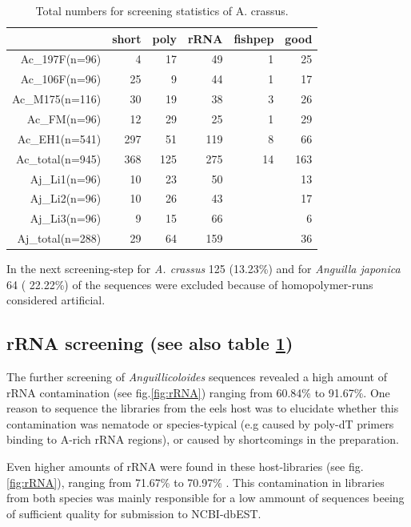\documentclass[12pt,a4paper]{article}
\begin{document}
\begin{table}[ht]
\begin{center}
\begin{tabular}{rrrrrr}
  \hline
 & short & poly & rRNA & fishpep & good \\ 
  \hline
Ac\_197F(n=96) &   4 &  17 &  49 &   1 &  25 \\ 
  Ac\_106F(n=96) &  25 &   9 &  44 &   1 &  17 \\ 
  Ac\_M175(n=116) &  30 &  19 &  38 &   3 &  26 \\ 
  Ac\_FM(n=96) &  12 &  29 &  25 &   1 &  29 \\ 
  Ac\_EH1(n=541) & 297 &  51 & 119 &   8 &  66 \\ 
  Ac\_total(n=945) & 368 & 125 & 275 &  14 & 163 \\ 
  Aj\_Li1(n=96) &  10 &  23 &  50 &  &  13 \\ 
  Aj\_Li2(n=96) &  10 &  26 &  43 &  &  17 \\ 
  Aj\_Li3(n=96) &   9 &  15 &  66 &  &   6 \\ 
  Aj\_total(n=288) &  29 &  64 & 159 &  &  36 \\ 
   \hline
\end{tabular}
\caption{Total numbers for screening statistics of A. crassus.}
\label{tab:num}
\end{center}
\end{table}
In the next screening-step for \textit{A. crassus}
125
(13.23\%) and for
\textit{Anguilla japonica}  64 (
22.22\%) of the sequences were
excluded because of homopolymer-runs considered artificial.

\subsection*{rRNA screening (see also table \ref{tab:num})}

The further screening of \textit{Anguillicoloides} sequences revealed
a high amount of rRNA contamination (see fig.\ref{fig:rRNA}) ranging
from 60.84\% to
91.67\%. One reason to sequence
the libraries from the eels host was to elucidate whether this
contamination was nematode or species-typical (e.g caused by poly-dT
primers binding to A-rich rRNA regions), or caused by shortcomings in
the preparation.

Even higher amounts of rRNA were found in these host-libraries (see
fig. \ref{fig:rRNA}), ranging from
71.67\% to
70.97\% . This contamination in
libraries from both species was mainly responsible for a low ammount
of sequences beeing of sufficient quality for submission to
NCBI-dbEST.
\end{document}
